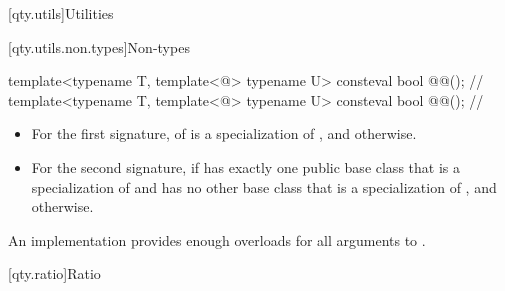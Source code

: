 [qty.utils]{Utilities}

[qty.utils.non.types]{Non-types}

\begin{itemdecl}
template<typename T, template<@\seebelow@> typename U>
consteval bool @@();               // \expos
template<typename T, template<@\seebelow@> typename U>
consteval bool @@();  // \expos
\end{itemdecl}

\begin{itemdescr}
\pnum
\returns
\begin{itemize}
\item
For the first signature,
 of  is a specialization of , and
 otherwise.
\item
For the second signature,
 if  has exactly one public base class
that is a specialization of 
and has no other base class that is a specialization of , and
 otherwise.
\end{itemize}

\pnum
\remarks
An implementation provides enough overloads for all arguments to .
\end{itemdescr}

[qty.ratio]{Ratio}

